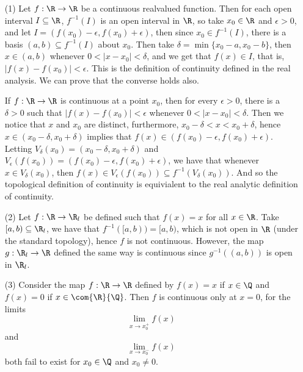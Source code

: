 \begin{example}
    \begin{enumerate}
        \item[(1)] Let $f:\R \rightarrow \R$ be a continuous realvalued function.
            Then for each open interval  $I \subseteq \R$,  $f^{-1}(I)$ is an
            open interval in  $\R$, so take  $x_0 \in \R$ and $\epsilon>0$, and
            let $I=(f(x_0)-\epsilon,f(x_0)+\epsilon)$, then since $ x_0 \in
            f^{-1}(I)$, there is a basis $(a,b) \subseteq f^{-1}(I)$ about
            $x_0$. Then take  $\delta=\min\{x_0-a,x_0-b\}$, then $x \in (a,b)$
            whenever $0<|x-x_0|<\delta$, and we get that $f(x) \in I$, that is,
            $|f(x)-f(x_0)|<\epsilon$. This is the definition of continuity
            defined in the real analysis. We can prove that the converse holds
            also.

            If $f:\R \rightarrow \R$ is continuous at a point $x_0$, then for
            every $\epsilon>0$, there is a  $\delta>0$ such that
            $|f(x)-f(x_0)|<\epsilon$ whenever $0<|x-x_0|<\delta$. Then we notice
            that $x$ and  $ x_0$ are distinct, furthermore, $x_0-\delta<x
            <x_0+\delta$, hence $x \in (x_0-\delta,x_0+\delta)$ implies that
            $f(x) \in (f(x_0)-\epsilon,f(x_0)+\epsilon)$. Letting
            $V_{\delta}(x_0)=(x_0-\delta,x_0+\delta) $ and
            $V_{\epsilon}(f(x_0))=(f(x_0)-\epsilon,f(x_0)+\epsilon)$, we have
            that whenever  $x \in V_{\delta}(x_0)$, then $f(x) \in
            V_{\epsilon}(f(x_0)) \subseteq f^{-1}(V_{\delta}(x_0))$. And so the
            topological definition of continuity is equivialent to the real
            analytic definition of continuity.

        \item[(2)] Let $f:\R \rightarrow \R_l$ be defined such that  $f(x)=x$ for all
            $x \in \R$. Take  $[a,b) \subseteq \R_l$, we have that
            $f^{-1}([a,b))=[a,b)$, which is not open in  $\R$  (under the
            standard topology), hence $f$ is not continuous. However, the map
            $g:\R_l \rightarrow \R$ defined the same way is continuous since
            $g^{-1}((a,b))$ is open in  $\R_l$.

        \item[(3)] Consider the map $f:\R \rightarrow \R$ defined by $f(x)=x$ if
            $x \in \Q$ and  $f(x)=0$ if $x \in \com{\R}{\Q}$. Then $f$ is
            continuous only at  $x=0$, for the limits
            \begin{equation*}
                \lim_{x \rightarrow x_0^+}{f(x)}
            \end{equation*}
            and
            \begin{equation*}
                \lim_{x \rightarrow x_0^-}{f(x)}
            \end{equation*}
            both fail to exist for $x_0 \in \Q$ and $x_0 \neq 0$.


\end{enumerate}
\end{example}
